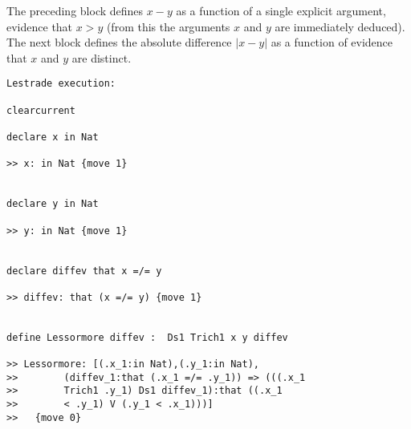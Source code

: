 \documentclass[12pt]{article}
\begin{document}
The preceding block defines $x-y$ as a function of a single explicit argument, evidence that $x>y$ (from this the arguments $x$ and $y$ are immediately deduced).  The next block defines the absolute difference $|x-y|$ as a function of evidence that $x$ and $y$ are distinct.

\begin{verbatim}Lestrade execution:

clearcurrent

declare x in Nat

>> x: in Nat {move 1}


declare y in Nat

>> y: in Nat {move 1}


declare diffev that x =/= y

>> diffev: that (x =/= y) {move 1}


define Lessormore diffev :  Ds1 Trich1 x y diffev

>> Lessormore: [(.x_1:in Nat),(.y_1:in Nat),
>>        (diffev_1:that (.x_1 =/= .y_1)) => (((.x_1 
>>        Trich1 .y_1) Ds1 diffev_1):that ((.x_1 
>>        < .y_1) V (.y_1 < .x_1)))]
>>   {move 0}


\end{verbatim}
\end{document}
